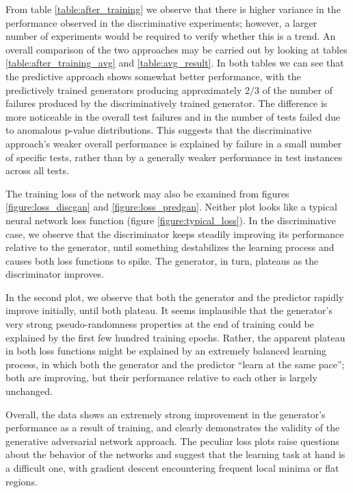 \documentclass[12pt, titlepage]{report}
\theoremstyle{definition}
\begin{document}
From table \ref{table:after_training} we observe that there is higher variance in the performance observed in the discriminative experiments; however, a larger number of experiments would be required to verify whether this is a trend. An overall comparison of the two approaches may be carried out by looking at tables \ref{table:after_training_avg} and \ref{table:avg_result}. In both tables we can see that the predictive approach shows somewhat better performance, with the predictively trained generators producing approximately $2/3$ of the number of failures produced by the discriminatively trained generator. The difference is more noticeable in the overall test failures and in the number of tests failed due to anomalous p-value distributions. This suggests that the discriminative approach's weaker overall performance is explained by failure in a small number of specific tests, rather than by a generally weaker performance in test instances across all tests.

The training loss of the network may also be examined from figures \ref{figure:loss_discgan} and \ref{figure:loss_predgan}. Neither plot looks like a typical neural network loss function (figure \ref{figure:typical_loss}). In the discriminative case, we observe that the discriminator keeps steadily improving its performance relative to the generator, until something destabilizes the learning process and causes both loss functions to spike. The generator, in turn, plateaus as the discriminator improves.

In the second plot, we observe that both the generator and the predictor rapidly improve initially, until both plateau. It seems implausible that the generator's very strong pseudo-randomness properties at the end of training could be explained by the first few hundred training epochs. Rather, the apparent plateau in both loss functions might be explained by an extremely balanced learning process, in which both the generator and the predictor ``learn at the same pace''; both are improving, but their performance relative to each other is largely unchanged.

Overall, the data shows an extremely strong improvement in the generator's performance as a result of training, and clearly demonstrates the validity of the generative adversarial network approach. The peculiar loss plots raise questions about the behavior of the networks and suggest that the learning task at hand is a difficult one, with gradient descent encountering frequent local minima or flat regions.
\end{document}
